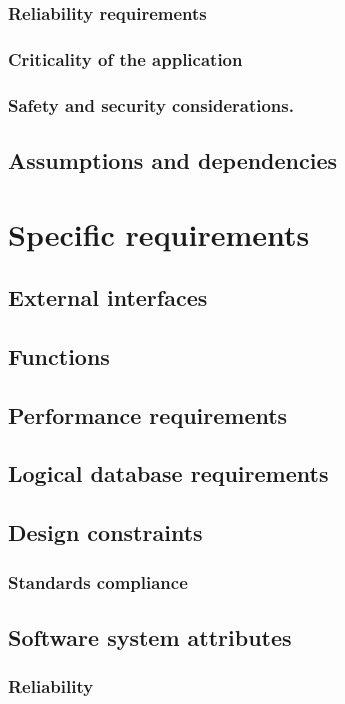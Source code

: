 \documentclass[draftclsnofoot,onecolumn,letterpaper,10pt,compsoc]{IEEEtran}
\begin{document}
		\subsubsection{Reliability requirements}
		\subsubsection{Criticality of the application}
		\subsubsection{Safety and security considerations.}
	\subsection{Assumptions and dependencies}

\section{Specific requirements}
	\subsection{External interfaces}
	\subsection{Functions}
	\subsection{Performance requirements}
	\subsection{Logical database requirements}
	\subsection{Design constraints}
		\subsubsection{Standards compliance}
	\subsection{Software system attributes}
		\subsubsection{Reliability}
\end{document}
